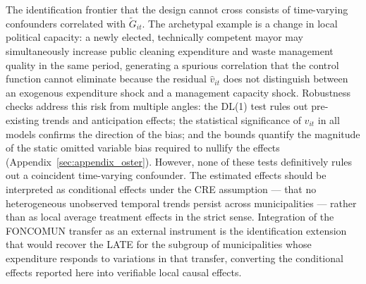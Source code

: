 The identification frontier that the design cannot cross consists of time-varying confounders correlated with $\tilde{G}_{it}$.
The archetypal example is a change in local political capacity: a newly elected, technically competent mayor may simultaneously increase public cleaning expenditure and waste management quality in the same period, generating a spurious correlation that the control function cannot eliminate because the residual $\hat{v}_{it}$ does not distinguish between an exogenous expenditure shock and a management capacity shock.
Robustness checks address this risk from multiple angles: the DL(1) test rules out pre-existing trends and anticipation effects; the statistical significance of $\hat{v}_{it}$ in all models confirms the direction of the bias; and the \citet{Oster2019} bounds quantify the magnitude of the static omitted variable bias required to nullify the effects (Appendix~\ref{sec:appendix_oster}).
However, none of these tests definitively rules out a coincident time-varying confounder.
The estimated effects should be interpreted as conditional effects under the CRE assumption --- that no heterogeneous unobserved temporal trends persist across municipalities --- rather than as local average treatment effects in the strict sense.
Integration of the FONCOMUN transfer as an external instrument is the identification extension that would recover the LATE for the subgroup of municipalities whose expenditure responds to variations in that transfer, converting the conditional effects reported here into verifiable local causal effects.
